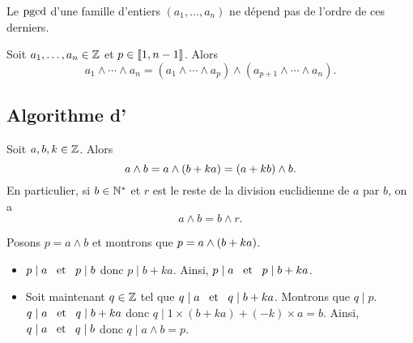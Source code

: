 \documentclass{magnolia}
\begin{document}
\begin{remarqueUnique}
\remarque Le $\operatorname{pgcd}$ d'une famille d'entiers $(a_1,\ldots,a_n)$ ne dépend pas de l'ordre de
  ces derniers.
\end{remarqueUnique}

\begin{proposition}
Soit $a_1,\ldots,a_n\in\mathbb{Z}$ et $p\in\left\llbracket 1,n-1\right\rrbracket$. Alors
\[a_1\wedge\cdots\wedge a_n=(a_1\wedge\cdots\wedge a_p)\wedge(a_{p+1}\wedge\cdots\wedge a_n).\]
\end{proposition}


\subsection{Algorithme d'}

\begin{proposition}
Soit $a,b,k\in\mathbb{Z}$. Alors
\[a\wedge b=a\wedge\left(b+ka\right)=\left(a+kb\right)\wedge b.\]
En particulier, si $b\in{\mathbb{N}^*}$ et $r$ est le reste de la division euclidienne de
$a$ par $b$, on a
\[a\wedge b=b\wedge r.\]
\end{proposition}

\begin{preuve}
Posons $p=a\wedge b$ et montrons que $p=a\wedge\left(b+ka\right)$.
\begin{itemize}
\item $p\mid a \quad\!\text{et}\quad\! p\mid b$ donc $p\mid b+ka$. Ainsi, $p\mid a \quad\!\text{et}\quad\! p\mid b+ka$.
\item Soit maintenant $q\in\mathbb{Z}$ tel que $q\mid a \quad\!\text{et}\quad\! q\mid b+ka$. Montrons que $q\mid p$.\\
$q\mid a \quad\!\text{et}\quad\! q\mid b+ka$ donc $q\mid 1\times (b+ka)+(-k)\times a=b$. Ainsi, $q\mid a \quad\!\text{et}\quad\! q\mid b$ donc $q\mid a\wedge b=p$.
\end{itemize}
\end{preuve}
\end{document}
